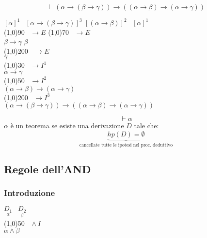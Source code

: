 \documentclass{article}
\theoremstyle{break}
\theoremstyle{break}
\theoremstyle{break}
\theoremstyle{break}
\begin{document}
\begin{exercise}[hard]
  \[
    \vdash (\alpha \to (\beta \to \gamma)) \to ((\alpha \to \beta) \to (\alpha \to \gamma))
  \] 
  \begin{center}
    \( [\alpha]^1\;\;\; [\alpha \to (\beta \to \gamma)]^3 \) \hspace{2.5cm} \([(\alpha \to \beta)]^2\;\;\; [\alpha]^1 \)\\
    \hspace{1cm}\line(1,0){90}\(\;\;\; \to E \) \hspace{1cm}\line(1,0){70}\(\;\;\; \to E \)\\
    \( \beta \to \gamma \) \hspace{3.5cm} \( \beta \)\\
    \hspace{1cm}\line(1,0){200}\( \;\;\; \to E \)\\
    \( \gamma \) \\
    \hspace{1cm}\line(1,0){30}\(\;\;\; \to I^1 \)\\
    \( \alpha \to  \gamma \) \\
    \hspace{1cm}\line(1,0){50}\(\;\;\; \to I^2 \)\\
    \( (\alpha \to \beta) \to (\alpha \to \gamma) \) \\
    \hspace{1cm}\line(1,0){200}\(\;\;\; \to I^3 \)\\
    \( (\alpha \to (\beta \to \gamma)) \to ((\alpha \to \beta) \to (\alpha \to \gamma)) \) 
  \end{center}
\end{exercise}

\begin{definition}
  \[
    \vdash \alpha
  \] 
  \( \alpha \) è un teorema se esiste una derivazione \( D \)
  tale che: \[ \underbrace{hp(D) = \emptyset}_{\text{cancellate tutte
  le ipotesi nel proc. deduttivo}} \] 
\end{definition}

\subsection{Regole dell'AND}
\subsubsection{Introduzione}
\begin{center}
  \(
  \underset{\alpha}{D_1}\;\;\; \underset{\beta}{D_2}
  \)\\ 
  \hspace{0.6cm}\line(1,0){50}\(\;\;\; \wedge I \)\\  
  \(
  \alpha \wedge \beta
  \)
\end{center}
\end{document}
